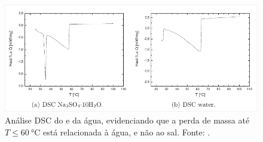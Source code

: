 \begin{figure}
    \centering
    \includegraphics[width=\linewidth]{img/Glauber_Water_DSC_Rens2012.pdf}
    \caption{Análise DSC do  e da água, evidenciando que a perda de massa até $T \leq \qty{60}{\celsius}$ está relacionada à água, e não ao sal. Fonte: \textcite{Rens2012}.}
    \label{fig:glauber-dsc-water}
\end{figure}
